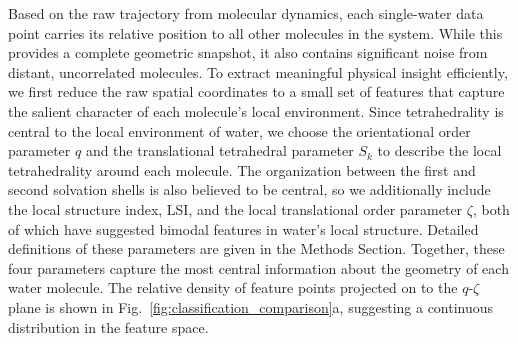\documentclass[aps, amsmath,amssymb, reprint, twocolumn, superscriptaddress]{revtex4-2}
\begin{document}
Based on the raw trajectory from molecular dynamics, each single-water data point carries its relative position to all other molecules in the system. While this provides a complete geometric snapshot, it also contains significant noise from distant, uncorrelated molecules. To extract meaningful physical insight efficiently, we first reduce the raw spatial coordinates to a small set of features that capture the salient character of each molecule's local environment. Since tetrahedrality is central to the local environment of water\cite{errington_relationship_2001,russo_understanding_2014,tanaka_revealing_2019}, we choose the orientational order parameter $q$ and the translational tetrahedral parameter $S_k$ to describe the local tetrahedrality around each molecule\cite{chau_new_1998,errington_relationship_2001,duboue-dijon_characterization_2015}. The organization between the first and second solvation shells is also believed to be central, so we additionally include the local structure index, LSI, and the local translational order parameter $\zeta$, both of which have suggested bimodal features in water's local structure\cite{shiratani_growth_1996,russo_understanding_2014}. Detailed definitions of these parameters are given in the Methods Section. Together, these four parameters capture the most central information about the geometry of each water molecule. The relative density of feature points projected on to the $q$-$\zeta$ plane is shown in Fig.~\ref{fig:classification_comparison}a, suggesting a continuous distribution in the feature space.
\end{document}

